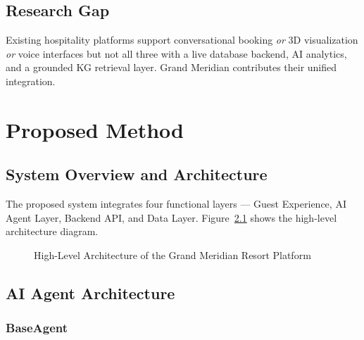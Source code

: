 \documentclass[11pt,a4paper]{report}
\begin{document}
\section{Research Gap}

Existing hospitality platforms support conversational booking \emph{or} 3D visualization \emph{or} voice interfaces but not all three with a live database backend, AI analytics, and a grounded KG retrieval layer. Grand Meridian contributes their unified integration.

\chapter{Proposed Method}

\section{System Overview and Architecture}

The proposed system integrates four functional layers — Guest Experience, AI Agent Layer, Backend API, and Data Layer. Figure~\ref{fig:system_arch} shows the high-level architecture diagram.

\begin{figure}[H]
\centering
\caption{High-Level Architecture of the Grand Meridian Resort Platform}
\label{fig:system_arch}
\end{figure}

\section{AI Agent Architecture}

\subsection{BaseAgent}
\end{document}
